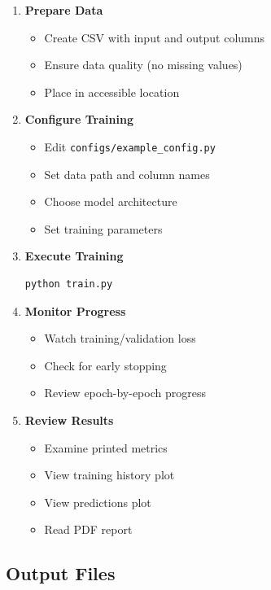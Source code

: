 \documentclass[11pt,a4paper]{article}
\begin{document}
\begin{enumerate}
    \item \textbf{Prepare Data}
    \begin{itemize}
        \item Create CSV with input and output columns
        \item Ensure data quality (no missing values)
        \item Place in accessible location
    \end{itemize}

    \item \textbf{Configure Training}
    \begin{itemize}
        \item Edit \texttt{configs/example\_config.py}
        \item Set data path and column names
        \item Choose model architecture
        \item Set training parameters
    \end{itemize}

    \item \textbf{Execute Training}
    \begin{lstlisting}[language=bash]
python train.py
    \end{lstlisting}

    \item \textbf{Monitor Progress}
    \begin{itemize}
        \item Watch training/validation loss
        \item Check for early stopping
        \item Review epoch-by-epoch progress
    \end{itemize}

    \item \textbf{Review Results}
    \begin{itemize}
        \item Examine printed metrics
        \item View training history plot
        \item View predictions plot
        \item Read PDF report
    \end{itemize}
\end{enumerate}

\subsection{Output Files}
\end{document}
